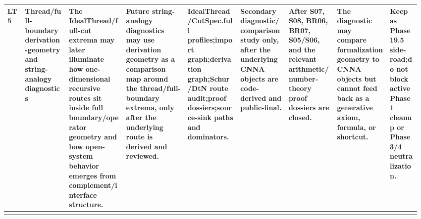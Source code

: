 \begin{longtable}{L{0.04\linewidth} L{0.105\linewidth} L{0.135\linewidth} L{0.145\linewidth} L{0.12\linewidth} L{0.115\linewidth} L{0.115\linewidth} L{0.12\linewidth} L{0.075\linewidth}}
LT5 & Thread/\allowbreak{}full-boundary derivation-geometry and string-analogy diagnostics & The IdealThread/\allowbreak{}full-cut extrema may later illuminate how one-dimensional recursive routes sit inside full boundary/\allowbreak{}operator geometry and how open-system behavior emerges from complement/\allowbreak{}interface structure. & Future string-analogy diagnostics may use derivation geometry as a comparison map around the thread/\allowbreak{}full-boundary extrema, only after the underlying route is derived and reviewed. & IdealThread/\allowbreak{}CutSpec.full profiles;\newline import graph;\newline derivation graph;\newline Schur/\allowbreak{}DtN route audit;\newline proof dossiers;\newline source-sink paths and dominators. & Secondary diagnostic/\allowbreak{}comparison study only, after the underlying CNNA objects are code-derived and public-final. & After S07, S08, BR06, BR07, S05/\allowbreak{}S06, and the relevant arithmetic/\allowbreak{}number-theory proof dossiers are closed. & The diagnostic may compare formalization geometry to CNNA objects but cannot feed back as a generative axiom, formula, or shortcut. & Keep as Phase 19.5 side-road;\newline do not block active Phase 1 cleanup or Phase 3/\allowbreak{}4 neutralization.\\
\hline
\addlinespace[0.24em]

\end{longtable}
